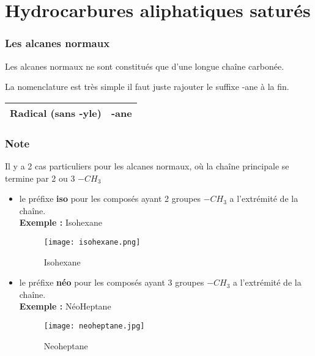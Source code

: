 \documentclass[a4paper, oneside]{book}
\begin{document}
\section{Hydrocarbures aliphatiques saturés}
\subsubsection{Les alcanes normaux}
Les alcanes normaux ne sont constitués que d'une longue chaîne carbonée.

La nomenclature est très simple il faut juste rajouter le suffixe -ane à la fin. 
\begin{center}
    \begin{tabular}{|c|c|}
        \hline
         \textbf{Radical (sans -yle) }  & \textbf{-ane} \\
         \hline
    \end{tabular}
\end{center}
\subsubsection{Note}
Il y a 2 cas particuliers pour les alcanes normaux, où la chaîne principale se termine par 2 ou 3 $-CH_3$ 
\begin{itemize}
    \item le préfixe \textbf{iso} pour les composés ayant 2 groupes $-CH_3$ a l'extrémité de la chaîne.\\
    \textbf{Exemple :} Isohexane
    \begin{figure}[!ht]
        \centering
        \texttt{[image: isohexane.png]}
        \caption{Isohexane}
        \label{fig:my_label}
    \end{figure}
    \newpage
    \item le préfixe \textbf{néo} pour les composés ayant 3 groupes $-CH_3$ a l'extrémité de la chaîne.\\
    \textbf{Exemple :} NéoHeptane
    \begin{figure}[!ht]
        \centering
        \texttt{[image: neoheptane.jpg]}
        \caption{Neoheptane}
        \label{fig:my_label}
    \end{figure}
\end{itemize}
\end{document}
